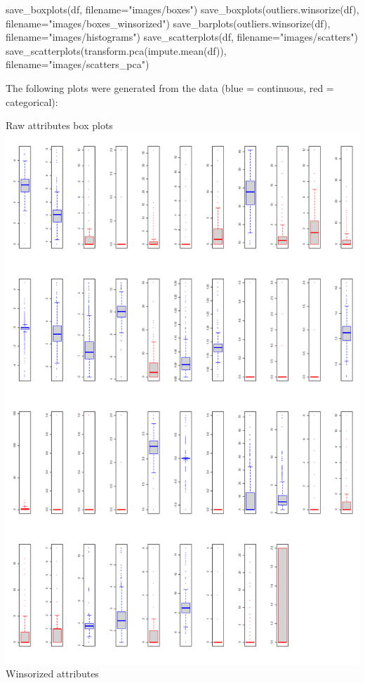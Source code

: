 \documentclass[
]{article}
\newenvironment{Shaded}{\begin{snugshade}}{\end{snugshade}}
\newcommand{\NormalTok}[1]{#1}
\begin{document}
\begin{Shaded}
\begin{Highlighting}[]
\NormalTok{save\_boxplots(df, filename="images/boxes")}
\NormalTok{save\_boxplots(outliers.winsorize(df), filename="images/boxes\_winsorized")}
\NormalTok{save\_barplots(outliers.winsorize(df), filename="images/histograms")}
\NormalTok{save\_scatterplots(df, filename="images/scatters")}
\NormalTok{save\_scatterplots(transform.pca(impute.mean(df)), filename="images/scatters\_pca")}
\end{Highlighting}
\end{Shaded}

The following plots were generated from the data (blue = continuous, red
= categorical):

Raw attributes box plots\\
\includegraphics[width=0.7\columnwidth]{images/boxes.png}
\pagebreak \\
Winsorized attributes\\
\end{document}
